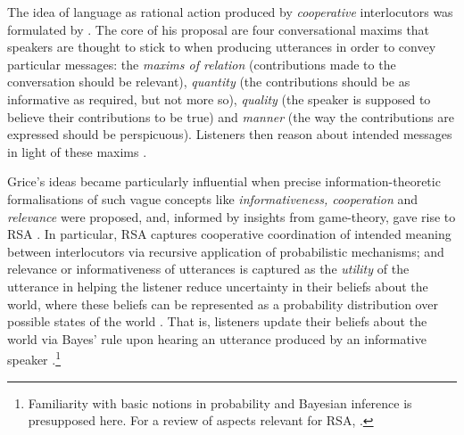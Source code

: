 The idea of language as rational action produced by \emph{cooperative} interlocutors was formulated by \textcite{grice1975logic}. The core of his proposal are four conversational maxims that speakers are thought to stick to when producing utterances in order to convey particular messages: the \emph{maxims of relation} (contributions made to the conversation should be relevant), \emph{quantity} (the contributions should be as informative as required, but not more so), \emph{quality} (the speaker is supposed to believe their contributions to be true) and \emph{manner} (the way the contributions are expressed should be perspicuous). Listeners then reason about intended messages in light of these maxims \parencite{grice1975logic}.

Grice’s ideas became particularly influential when precise information-theoretic formalisations of such vague concepts like \emph{informativeness, cooperation} and \emph{relevance} were proposed, and, informed by insights from game-theory, gave rise to RSA \parencite{frank2012predicting}.
In particular, RSA captures cooperative coordination of intended meaning between interlocutors via recursive application of probabilistic mechanisms; and relevance or informativeness of utterances is captured as the \emph{utility} of the utterance in helping the listener reduce uncertainty in their beliefs about the world, where these beliefs can be represented as a probability distribution over possible states of the world \parencite[as advocated by e.g.][]{tenenbaum2011grow}.  
That is, listeners update their beliefs about the world via Bayes' rule upon hearing an utterance produced by an informative speaker \parencite{frank2012predicting}.\footnote{Familiarity with basic notions in probability and Bayesian inference is presupposed here. For a review of aspects relevant for RSA, \textcite[see e.g.][]{lassiter2017adjectival}.}

